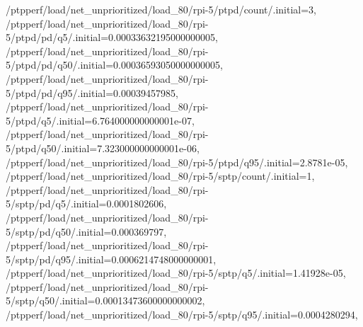 {    /ptpperf/load/net_unprioritized/load_80/rpi-5/ptpd/count/.initial=3,
    /ptpperf/load/net_unprioritized/load_80/rpi-5/ptpd/pd/q5/.initial=0.00033632195000000005,
    /ptpperf/load/net_unprioritized/load_80/rpi-5/ptpd/pd/q50/.initial=0.00036593050000000005,
    /ptpperf/load/net_unprioritized/load_80/rpi-5/ptpd/pd/q95/.initial=0.00039457985,
    /ptpperf/load/net_unprioritized/load_80/rpi-5/ptpd/q5/.initial=6.764000000000001e-07,
    /ptpperf/load/net_unprioritized/load_80/rpi-5/ptpd/q50/.initial=7.323000000000001e-06,
    /ptpperf/load/net_unprioritized/load_80/rpi-5/ptpd/q95/.initial=2.8781e-05,
    /ptpperf/load/net_unprioritized/load_80/rpi-5/sptp/count/.initial=1,
    /ptpperf/load/net_unprioritized/load_80/rpi-5/sptp/pd/q5/.initial=0.0001802606,
    /ptpperf/load/net_unprioritized/load_80/rpi-5/sptp/pd/q50/.initial=0.000369797,
    /ptpperf/load/net_unprioritized/load_80/rpi-5/sptp/pd/q95/.initial=0.0006214748000000001,
    /ptpperf/load/net_unprioritized/load_80/rpi-5/sptp/q5/.initial=1.41928e-05,
    /ptpperf/load/net_unprioritized/load_80/rpi-5/sptp/q50/.initial=0.00013473600000000002,
    /ptpperf/load/net_unprioritized/load_80/rpi-5/sptp/q95/.initial=0.0004280294,}